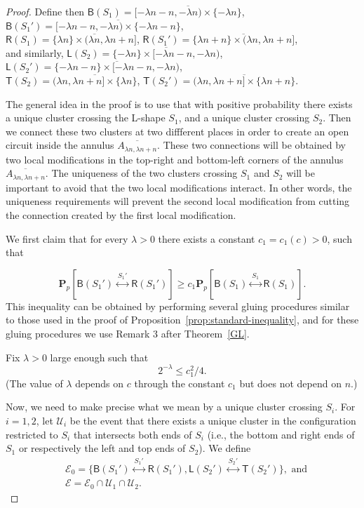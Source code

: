 \documentclass[12pt, twoside,a4paper,reqno]{amsart}
\theoremstyle{plain}
\theoremstyle{remark}
\theoremstyle{definition}
\newcommand{\PP}{\mathbf{P}}
\newcommand{\Pp}[1]{\PP_p \left [ #1 \right ]}
\newcommand{\lr}[1][]{\overset{\:#1\:}\longleftrightarrow}
\newcommand{\ol}{\overline}
\begin{document}
\begin{proof}
Define then $\mathsf B(S_1) =\ol{[-\lambda n-n, -\lambda n)\times
  \{-\lambda n\}}$, $\mathsf B(S_1') =\ol{[-\lambda n-n, -\lambda n)\times
  \{-\lambda n-n\}}$, \\$\mathsf R(S_1) =\ol{\{\lambda n\}\times (\lambda
  n,\lambda n+n]}$, $\mathsf R(S_1') =\ol{\{\lambda n +n\}\times (\lambda
  n,\lambda n+n]}$, \\and similarly, $\mathsf L(S_2) =\ol{\{-\lambda n\}\times
  [-\lambda n-n,-\lambda n)}$, $\mathsf L(S_2') =\ol{\{-\lambda n-n\}\times
  [-\lambda n-n,-\lambda n)}$,\\ $\mathsf T(S_2) =\ol{(\lambda n , \lambda
  n+n]\times \{\lambda n\}}$, $\mathsf T(S_2') =\ol{(\lambda n , \lambda
  n+n]\times \{\lambda n +n\}}$.

The general idea in the proof is to use that with positive probability there
exists a unique cluster crossing the L-shape $S_1$, and a unique cluster
crossing $S_2$. Then we connect these two clusters at two diffferent places in
order to create an open circuit inside the annulus $\ol{A_{\lambda n,\lambda
    n+n}}$. These two connections will be obtained by two local modifications in
the top-right and bottom-left corners of the annulus $\ol{A_{\lambda n,\lambda
    n+n}}$. The uniqueness of the two clusters crossing $S_1$ and $S_2$ will be
important to avoid that the two local modifications interact. In other words,
the uniqueness requirements will prevent the second local modification from
cutting the connection created by the first local modification.

We first claim that for every $\lambda>0$ there exists a constant
$c_1=c_1(c)>0$, such that

\begin{equation}
  \label{eq:65}
  \Pp{\mathsf B(S_1') \lr[S_1'] \mathsf R(S_1')}\ge c_1 \Pp{\mathsf B(S_1)\lr[S_1] \mathsf R(S_1)}.
\end{equation}
This inequality can be obtained by performing
several gluing procedures similar to those used in the proof of
Proposition~\ref{prop:standard-inequality}, and for these gluing procedures we
use Remark 3 after Theorem~\ref{GL}.


Fix $\lambda>0$ large enough such that
\begin{equation}
2^{-\lambda}\le c_1^2/4.\label{eq:71}
\end{equation}
(The value of $\lambda$ depends on $c$ through the constant $c_1$ but does not
depend on $n$.) 

Now, we need to make precise what we mean by a unique cluster crossing $S_i$.
For $i=1,2$, let $\mathcal U_i$ be the event that there exists a unique cluster
in the configuration restricted to $S_i$ that intersects both ends of $S_i$
(i.e., the bottom and right ends of $S_1$ or respectively the left and top ends
of $S_2$). We define
\begin{align}
  &\mathcal E_0= \{\mathsf B(S_1') \lr[S_1'] \mathsf R(S_1'), \mathsf L(S_2')
  \lr[S_2'] \mathsf T(S_2')\},\text{ and}\\
  &\mathcal E= \mathcal E_0\cap\mathcal U_1\cap\mathcal U_2.
\end{align}


\end{proof}
\end{document}
